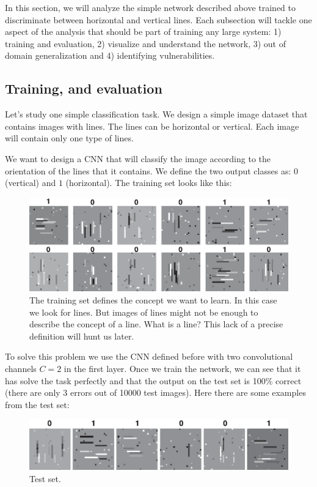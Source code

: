 In this section, we will analyze the simple network described above trained to discriminate between horizontal and vertical lines. Each subsection will tackle one aspect of the analysis that should be part of training any large system: 1) training and evaluation, 2) visualize and understand the network, 3) out of domain generalization and 4) identifying vulnerabilities. 

\subsection{Training, and evaluation}

Let's study one simple classification task. We design a simple image dataset that contains images with lines. The lines can be horizontal or vertical. Each image will contain only one type of lines. 

We want to design a CNN that will classify the image according to the orientation of the lines that it contains. We define the two output classes as: $0$ (vertical) and $1$ (horizontal). The training set looks like this:

\begin{figure}
\centerline{
\includegraphics[width=1.0\linewidth]{./figures/convolutional_neural_nets/oriented_bars_cnn_trainingset.eps}}
\caption{The training set defines the concept we want to learn. In this case we look for lines. But images of lines might not be enough to describe the concept of a line. What is a line? This lack of a precise definition will hunt us later.}
\end{figure}

To solve this problem we use the CNN defined before with two convolutional channels $C=2$ in the first layer. Once we train the network, we can see that it has solve the task perfectly and that the output on the test set is 100$\%$ correct (there are only 3 errors out of 10000 test images). Here there are some examples from the test set:

\begin{figure}
\includegraphics[width=1\linewidth]{./figures/convolutional_neural_nets/oriented_bars_cnn_testset.eps}
\caption{Test set.}
\end{figure}

